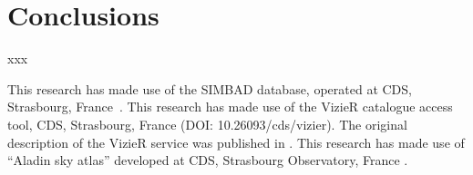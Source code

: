 \documentclass[draft]{aa}
\begin{document}
 \cite{Spina_2021}




\section{Conclusions}
 \label{sec:conclusions}

 xxx





\begin{acknowledgements}
 This research has made use of the SIMBAD database, operated at CDS,
 Strasbourg, France~\citep{Wenger_2000}.
 This research has made use of the VizieR catalogue access tool, CDS,
 Strasbourg, France (DOI: 10.26093/cds/vizier). The original description of
 the VizieR service was published in \cite{Ochsenbein_2000}.
 This research has made use of ``Aladin sky atlas'' developed at CDS,
 Strasbourg Observatory, France \citep{Bonnarel_2000,Boch_2014}.
\end{acknowledgements}




\end{document}

